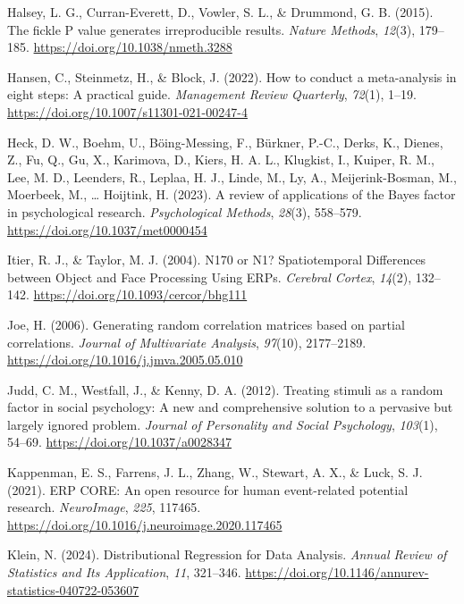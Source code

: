 \documentclass[
  doc,12pt,floatsintext]{apa7}
\newlength{\cslhangindent}
\newenvironment{CSLReferences}[2] %
 {\begin{list}{}{%
  \setlength{\itemindent}{0pt}
  \setlength{\leftmargin}{0pt}
  \setlength{\parsep}{0pt}
  \ifodd #1
   \setlength{\leftmargin}{\cslhangindent}
   \setlength{\itemindent}{-1\cslhangindent}
  \fi
  \setlength{\itemsep}{#2\baselineskip}}}
 {\end{list}}
\begin{document}
\begin{CSLReferences}{1}{0}
Halsey, L. G., Curran-Everett, D., Vowler, S. L., \& Drummond, G. B. (2015). The fickle {P} value generates irreproducible results. \emph{Nature Methods}, \emph{12}(3), 179--185. \url{https://doi.org/10.1038/nmeth.3288}

Hansen, C., Steinmetz, H., \& Block, J. (2022). How to conduct a meta-analysis in eight steps: A practical guide. \emph{Management Review Quarterly}, \emph{72}(1), 1--19. \url{https://doi.org/10.1007/s11301-021-00247-4}

Heck, D. W., Boehm, U., Böing-Messing, F., Bürkner, P.-C., Derks, K., Dienes, Z., Fu, Q., Gu, X., Karimova, D., Kiers, H. A. L., Klugkist, I., Kuiper, R. M., Lee, M. D., Leenders, R., Leplaa, H. J., Linde, M., Ly, A., Meijerink-Bosman, M., Moerbeek, M., \ldots{} Hoijtink, H. (2023). A review of applications of the {Bayes} factor in psychological research. \emph{Psychological Methods}, \emph{28}(3), 558--579. \url{https://doi.org/10.1037/met0000454}

Itier, R. J., \& Taylor, M. J. (2004). N170 or {N1}? {Spatiotemporal Differences} between {Object} and {Face Processing Using ERPs}. \emph{Cerebral Cortex}, \emph{14}(2), 132--142. \url{https://doi.org/10.1093/cercor/bhg111}

Joe, H. (2006). Generating random correlation matrices based on partial correlations. \emph{Journal of Multivariate Analysis}, \emph{97}(10), 2177--2189. \url{https://doi.org/10.1016/j.jmva.2005.05.010}

Judd, C. M., Westfall, J., \& Kenny, D. A. (2012). Treating stimuli as a random factor in social psychology: A new and comprehensive solution to a pervasive but largely ignored problem. \emph{Journal of Personality and Social Psychology}, \emph{103}(1), 54--69. \url{https://doi.org/10.1037/a0028347}

Kappenman, E. S., Farrens, J. L., Zhang, W., Stewart, A. X., \& Luck, S. J. (2021). {ERP CORE}: {An} open resource for human event-related potential research. \emph{NeuroImage}, \emph{225}, 117465. \url{https://doi.org/10.1016/j.neuroimage.2020.117465}

Klein, N. (2024). Distributional {Regression} for {Data Analysis}. \emph{Annual Review of Statistics and Its Application}, \emph{11}, 321--346. \url{https://doi.org/10.1146/annurev-statistics-040722-053607}


\end{CSLReferences}
\end{document}
